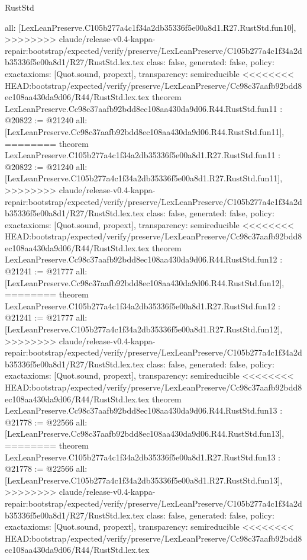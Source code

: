 \begin{lexlean}{RustStd}
\begin{coremodule}
{\begin{coremodule}
{{{{{{{{{{{{{{  all: [LexLeanPreserve.C105b277a4c1f34a2db35336f5e00a8d1.R27.RustStd.fun10],
>>>>>>>> claude/release-v0.4-kappa-repair:bootstrap/expected/verify/preserve/LexLeanPreserve/C105b277a4c1f34a2db35336f5e00a8d1/R27/RustStd.lex.tex
  class: false,
  generated: false,
  policy: exact{axioms: [Quot.sound, propext]},
  transparency: semireducible
}
<<<<<<<< HEAD:bootstrap/expected/verify/preserve/LexLeanPreserve/Cc98c37aafb92bdd8ec108aa430da9d06/R44/RustStd.lex.tex
theorem LexLeanPreserve.Cc98c37aafb92bdd8ec108aa430da9d06.R44.RustStd.fun11 : @20822 := @21240 {
  all: [LexLeanPreserve.Cc98c37aafb92bdd8ec108aa430da9d06.R44.RustStd.fun11],
========
theorem LexLeanPreserve.C105b277a4c1f34a2db35336f5e00a8d1.R27.RustStd.fun11 : @20822 := @21240 {
  all: [LexLeanPreserve.C105b277a4c1f34a2db35336f5e00a8d1.R27.RustStd.fun11],
>>>>>>>> claude/release-v0.4-kappa-repair:bootstrap/expected/verify/preserve/LexLeanPreserve/C105b277a4c1f34a2db35336f5e00a8d1/R27/RustStd.lex.tex
  class: false,
  generated: false,
  policy: exact{axioms: [Quot.sound, propext]},
  transparency: semireducible
}
<<<<<<<< HEAD:bootstrap/expected/verify/preserve/LexLeanPreserve/Cc98c37aafb92bdd8ec108aa430da9d06/R44/RustStd.lex.tex
theorem LexLeanPreserve.Cc98c37aafb92bdd8ec108aa430da9d06.R44.RustStd.fun12 : @21241 := @21777 {
  all: [LexLeanPreserve.Cc98c37aafb92bdd8ec108aa430da9d06.R44.RustStd.fun12],
========
theorem LexLeanPreserve.C105b277a4c1f34a2db35336f5e00a8d1.R27.RustStd.fun12 : @21241 := @21777 {
  all: [LexLeanPreserve.C105b277a4c1f34a2db35336f5e00a8d1.R27.RustStd.fun12],
>>>>>>>> claude/release-v0.4-kappa-repair:bootstrap/expected/verify/preserve/LexLeanPreserve/C105b277a4c1f34a2db35336f5e00a8d1/R27/RustStd.lex.tex
  class: false,
  generated: false,
  policy: exact{axioms: [Quot.sound, propext]},
  transparency: semireducible
}
<<<<<<<< HEAD:bootstrap/expected/verify/preserve/LexLeanPreserve/Cc98c37aafb92bdd8ec108aa430da9d06/R44/RustStd.lex.tex
theorem LexLeanPreserve.Cc98c37aafb92bdd8ec108aa430da9d06.R44.RustStd.fun13 : @21778 := @22566 {
  all: [LexLeanPreserve.Cc98c37aafb92bdd8ec108aa430da9d06.R44.RustStd.fun13],
========
theorem LexLeanPreserve.C105b277a4c1f34a2db35336f5e00a8d1.R27.RustStd.fun13 : @21778 := @22566 {
  all: [LexLeanPreserve.C105b277a4c1f34a2db35336f5e00a8d1.R27.RustStd.fun13],
>>>>>>>> claude/release-v0.4-kappa-repair:bootstrap/expected/verify/preserve/LexLeanPreserve/C105b277a4c1f34a2db35336f5e00a8d1/R27/RustStd.lex.tex
  class: false,
  generated: false,
  policy: exact{axioms: [Quot.sound, propext]},
  transparency: semireducible
}
<<<<<<<< HEAD:bootstrap/expected/verify/preserve/LexLeanPreserve/Cc98c37aafb92bdd8ec108aa430da9d06/R44/RustStd.lex.tex
}}}}}}}}}}}}}}}}
\end{coremodule}}
\end{coremodule}
\end{lexlean}
